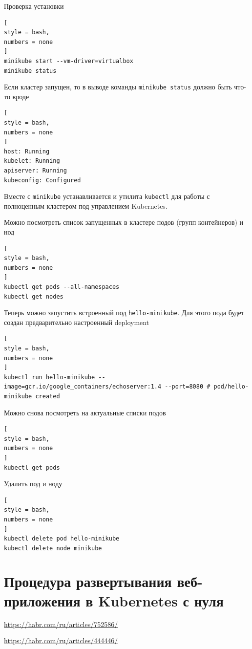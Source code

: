 \documentclass[%
	11pt,
	a4paper,
	utf8,
		]{article}
\begin{document}
Проверка установки
\begin{lstlisting}[
style = bash,
numbers = none	
]
minikube start --vm-driver=virtualbox
minikube status
\end{lstlisting}

Если кластер запущен, то в выводе команды \texttt{minikube status} должно быть что-то вроде
\begin{lstlisting}[
style = bash,
numbers = none	
]
host: Running
kubelet: Running
apiserver: Running
kubeconfig: Configured
\end{lstlisting}

Вместе с \texttt{minikube} устанавливается и утилита \texttt{kubectl} для работы с полноценным кластером под управлением Kubernetes.

Можно посмотреть список запущенных в кластере подов (групп контейнеров) и нод
\begin{lstlisting}[
style = bash,
numbers = none	
]
kubectl get pods --all-namespaces
kubectl get nodes
\end{lstlisting}

Теперь можно запустить встроенный под \texttt{hello-minikube}. Для этого пода будет создан предварительно настроенный deployment
\begin{lstlisting}[
style = bash,
numbers = none	
]
kubectl run hello-minikube --image=gcr.io/google_containers/echoserver:1.4 --port=8080 # pod/hello-minikube created
\end{lstlisting}

Можно снова посмотреть на актуальные списки подов
\begin{lstlisting}[
style = bash,
numbers = none	
]
kubectl get pods
\end{lstlisting}

Удалить под и ноду
\begin{lstlisting}[
style = bash,
numbers = none	
]
kubectl delete pod hello-minikube
kubectl delete node minikube
\end{lstlisting}

\section{Процедура развертывания веб-приложения в Kubernetes с нуля}

\url{https://habr.com/ru/articles/752586/}

\url{https://habr.com/ru/articles/444446/}
\end{document}
